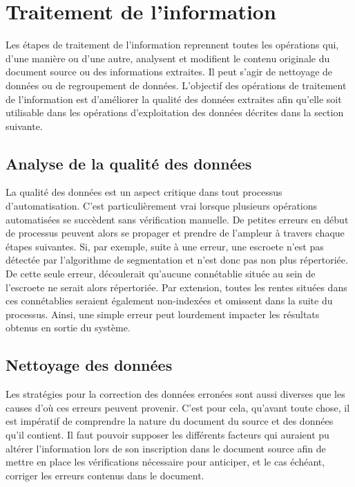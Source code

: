 \section{Traitement de l'information}
Les étapes de traitement de l'information reprennent toutes les opérations qui, d'une manière ou d'une autre, analysent et modifient le contenu originale du document source ou des informations extraites. Il peut s'agir de nettoyage de données ou de regroupement de données. 
L'objectif des opérations de traitement de l'information est d'améliorer la qualité des données extraites afin qu'elle soit utilisable dans les opérations d'exploitation des données décrites dans la section suivante.

\subsection{Analyse de la qualité des données} %
La qualité des données est un aspect critique dans tout processus d'automatisation. C'est particulièrement vrai lorsque plusieurs opérations automatisées se succèdent sans vérification manuelle. De petites erreurs en début de processus peuvent alors se propager et prendre de l'ampleur à travers chaque étapes suivantes. Si, par exemple, suite à une erreur, une escroete n'est pas détectée par l'algorithme de segmentation et n'est donc pas non plus répertoriée. De cette seule erreur, découlerait qu'aucune connétablie située au sein de l'escroete ne serait alors répertoriée. Par extension, toutes les rentes situées dans ces connétablies seraient également non-indexées et omissent dans la suite du processus. Ainsi, une simple erreur peut lourdement impacter les résultats obtenus en sortie du système.

\subsection{Nettoyage des données}
Les stratégies pour la correction des données erronées sont aussi diverses que les causes d'où ces erreurs peuvent provenir. C'est pour cela, qu'avant toute chose, il est impératif de comprendre la nature du document du source et des données qu'il contient. Il faut pouvoir supposer les différents facteurs qui auraient pu altérer l'information lors de son inscription dans le document source afin de mettre en place les vérifications nécessaire pour anticiper, et le cas échéant, corriger les erreurs contenus dans le document.

